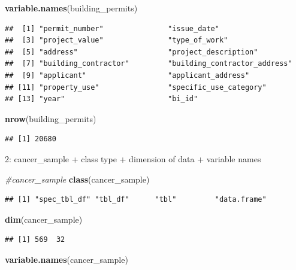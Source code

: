 \documentclass[
]{article}
\newenvironment{Shaded}{\begin{snugshade}}{\end{snugshade}}
\newcommand{\CommentTok}[1]{\textcolor[rgb]{0.56,0.35,0.01}{\textit{#1}}}
\newcommand{\KeywordTok}[1]{\textcolor[rgb]{0.13,0.29,0.53}{\textbf{#1}}}
\newcommand{\NormalTok}[1]{#1}
\begin{document}
\begin{Shaded}
\begin{Highlighting}[]
\KeywordTok{variable.names}\NormalTok{(building\_permits)}
\end{Highlighting}
\end{Shaded}

\begin{verbatim}
##  [1] "permit_number"               "issue_date"                 
##  [3] "project_value"               "type_of_work"               
##  [5] "address"                     "project_description"        
##  [7] "building_contractor"         "building_contractor_address"
##  [9] "applicant"                   "applicant_address"          
## [11] "property_use"                "specific_use_category"      
## [13] "year"                        "bi_id"
\end{verbatim}

\begin{Shaded}
\begin{Highlighting}[]
\KeywordTok{nrow}\NormalTok{(building\_permits)}
\end{Highlighting}
\end{Shaded}

\begin{verbatim}
## [1] 20680
\end{verbatim}

2: cancer\_sample + class type + dimension of data + variable names

\begin{Shaded}
\begin{Highlighting}[]
\CommentTok{\#cancer\_sample}
\KeywordTok{class}\NormalTok{(cancer\_sample)}
\end{Highlighting}
\end{Shaded}

\begin{verbatim}
## [1] "spec_tbl_df" "tbl_df"      "tbl"         "data.frame"
\end{verbatim}

\begin{Shaded}
\begin{Highlighting}[]
\KeywordTok{dim}\NormalTok{(cancer\_sample)}
\end{Highlighting}
\end{Shaded}

\begin{verbatim}
## [1] 569  32
\end{verbatim}

\begin{Shaded}
\begin{Highlighting}[]
\KeywordTok{variable.names}\NormalTok{(cancer\_sample)}
\end{Highlighting}
\end{Shaded}
\end{document}
